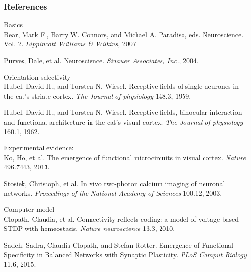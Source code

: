 \documentclass[xcolor=x11names,compress]{beamer}
\renewcommand{\(}{\begin{columns}}
\renewcommand{\)}{\end{columns}}
\newcommand{\<}[1]{\begin{column}{#1}}
\renewcommand{\>}{\end{column}}
\begin{document}
\begin{frame}[t]
    \frametitle<presentation>{References}    

    \scriptsize
    Basics\\
    \vspace{0.1cm}
    \tiny
    Bear, Mark F., Barry W. Connors, and Michael A. Paradiso, eds. 
    Neuroscience. Vol. 2. 
    \textit{Lippincott Williams \& Wilkins}, 2007.
    \vspace{0.1cm}

    Purves, Dale, et al.
    Neuroscience.
    \textit{Sinauer Associates, Inc.}, 2004. 
    \vspace{0.1cm}
    
    \scriptsize
    Orientation selectivity\\
    \vspace{0.1cm}
    \tiny
    Hubel, David H., and Torsten N. Wiesel. 
    Receptive fields of single neurones in the cat's striate cortex. 
    \textit{The Journal of physiology} 148.3, 1959.
    \vspace{0.1cm}

    Hubel, David H., and Torsten N. Wiesel. 
    Receptive fields, binocular interaction and functional architecture in the cat's visual cortex.
    \textit{The Journal of physiology} 160.1, 1962.
    \vspace{0.1cm}

    \scriptsize
    Experimental evidence:\\
    \vspace{0.1cm}
    \tiny
    Ko, Ho, et al. 
    The emergence of functional microcircuits in visual cortex. 
    \textit{Nature} 496.7443, 2013.
    \vspace{0.1cm}

    Stosiek, Christoph, et al. 
    In vivo two-photon calcium imaging of neuronal networks.
    \textit{Proceedings of the National Academy of Sciences} 100.12, 2003.
    \vspace{0.1cm}

    \scriptsize
    Computer model\\
    \vspace{0.1cm}
    \tiny
    Clopath, Claudia, et al. 
    Connectivity reflects coding: a model of voltage-based STDP with homeostasis.
    \textit{Nature neuroscience} 13.3, 2010.
    \vspace{0.1cm}

    Sadeh, Sadra, Claudia Clopath, and Stefan Rotter. 
    Emergence of Functional Specificity in Balanced Networks with Synaptic Plasticity.
    \textit{PLoS Comput Biology} 11.6, 2015.
    \vspace{0.1cm}

\end{frame}
\end{document}

